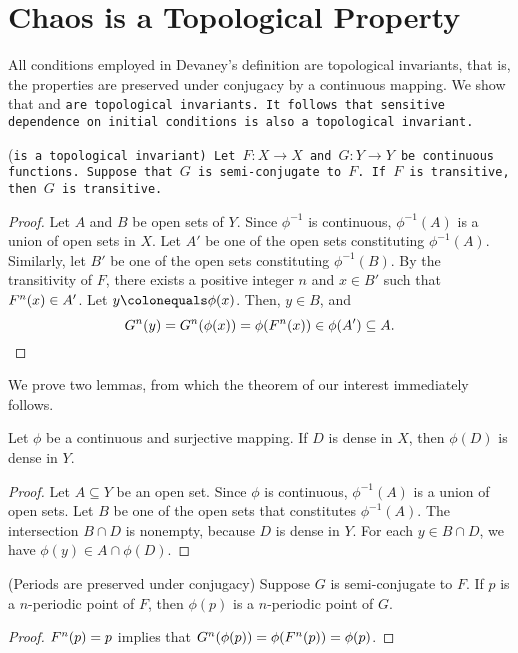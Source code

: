 \documentclass[10pt,draft,twoside]{book}
\begin{document}
\section{Chaos is a Topological Property}
All conditions employed in Devaney's definition are topological invariants, that is, the properties are preserved under conjugacy by a continuous mapping.
We show that \dpp and \tt are topological invariants.
It follows that sensitive dependence on initial conditions is also a topological invariant.
\begin{theorem}
  (\tt is a topological invariant) 
  Let $F: X \to X$ and $G: Y \to Y$ be continuous functions.
  Suppose that $G$ is semi-conjugate to $F$.
  If $F$ is transitive, then $G$ is transitive.
  \label{thm:conj-trans}
  \begin{proof}
    Let $A$ and $B$ be open sets of $Y$.
    Since $\phi^{-1}$ is continuous, $\phi^{-1}(A)$ is a union of open sets in $X$.
    Let $A'$ be one of the open sets constituting $\phi^{-1}(A)$.
    Similarly, let $B'$ be one of the open sets constituting $\phi^{-1}(B)$.
    By the transitivity of $F$, there exists a positive integer $n$ and $x \in B'$ such that $F^{n}(x)\in A'$.
    Let $y \ceq \phi(x)$.
    Then, $y \in B$, and 
    \begin{equation*}
      G^{n}(y) 
      = G^{n}(\phi(x))
      = \phi(F^{n}(x)) \in \phi(A') \subseteq A.
    \end{equation*}
  \end{proof}
\end{theorem}
We prove two lemmas, from which the theorem of our interest immediately follows.
\begin{lemma}
  Let $\phi$ be a continuous and surjective mapping.
  If $D$ is dense in $X$, then $\phi(D)$ is dense in $Y$.
  \label{thm:conj-dense}
  \begin{proof}
    Let $A \subseteq Y$ be an open set.
    Since $\phi$ is continuous, $\phi^{-1} (A)$ is a union of open sets.
    Let $B$ be one of the open sets that constitutes $\phi^{-1}(A)$.
    The intersection $B \cap D$ is nonempty, because $D$ is dense in $Y$.
    For each $y \in B \cap D$, we have $\phi(y) \in A \cap \phi(D)$.
  \end{proof}
\end{lemma}
\begin{lemma}
  (Periods are preserved under conjugacy)
  Suppose $G$ is semi-conjugate to $F$.
  If $p$ is a $n$-periodic point of $F$, then $\phi(p)$ is a $n$-periodic point of $G$.
  \label{thm:conj-per}
  \begin{proof}
    $F^{n}(p) = p$ implies that $G^{n}(\phi(p)) = \phi(F^{n}(p)) = \phi(p)$.
  \end{proof}
\end{lemma}
\end{document}
